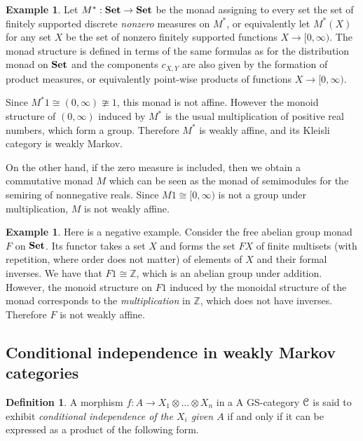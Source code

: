 \documentclass[a4paper,UKenglish,numberwithinsect,cleveref, autoref, thm-restate]{lipics-v2021}
\theoremstyle{plain} %
\theoremstyle{definition} %
\newtheorem{mydefinition}[mytheorem]{Definition}
\newtheorem{myexample}[mytheorem]{Example}
\begin{document}
\begin{myexample}
    \label{ex:nonzero_measures}
	Let $M^* : \mathbf{Set} \to \mathbf{Set}$ be the monad assigning to every set the set of finitely supported discrete \emph{nonzero}
	measures on $M^*$, or equivalently let $M^*(X)$ for any set $X$ be the set of nonzero finitely supported functions $X \to [0,\infty)$.
	The monad structure is defined in terms of the same formulas as for the distribution monad on $\mathbf{Set}$ and the
	components $c_{X,Y}$ are also given by the formation of product measures, or equivalently point-wise products of functions 
	$X \to [0,\infty)$.

	Since $M^* 1 \cong (0,\infty)\ncong 1$, this monad is not affine. However the monoid structure of $(0,\infty)$ induced by $M^*$ is the usual multiplication of positive real numbers, which form a group. Therefore $M^*$ is weakly affine, and its Kleisli category is weakly Markov.

	On the other hand, if the zero measure is included, then we obtain a commutative monad $M$ which can be seen as the monad of semimodules for the semiring of nonnegative reals.
	Since $M1 \cong [0,\infty)$ is not a group under multiplication, $M$ is not weakly affine.
\end{myexample}

\begin{myexample}
    \label{ex:nonexample}
    Here is a negative example.
    Consider the free abelian group monad $F$ on $\mathbf{Set}$. Its functor takes a set $X$ and forms the set $FX$ of finite multisets (with repetition, where order does not matter) of elements of $X$ and their formal inverses. 
    We have that $F1\cong \mathbb{Z}$, which is an abelian group under addition. 
    However, the monoid structure on $F1$ induced by the monoidal structure of the monad corresponds to the \emph{multiplication} in $\mathbb{Z}$, which does not have inverses. Therefore $F$ is not weakly affine. 
\end{myexample}


\subsection{Conditional independence in weakly Markov categories}

\begin{mydefinition}\label{defcondind}
 A morphism $f:A\to X_1\otimes\dots\otimes X_n$ in a A GS-category $\mathcal{C}$ is said to exhibit \emph{conditional independence of the $X_i$ given $A$} if and only if it can be expressed as a product of the following form.
\end{mydefinition}
\end{document}
